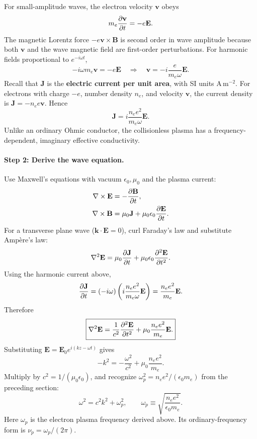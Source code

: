\documentclass[11pt]{article}
\newcommand{\epsz}{\epsilon_0}
\newcommand{\muz}{\mu_0}
\begin{document}
For small-amplitude waves, the electron velocity $\mathbf v$ obeys
\begin{equation}
m_e\pdv{\mathbf v}{t}=-e\mathbf E.
\end{equation}
The magnetic Lorentz force $-e\mathbf v\times\mathbf B$ is second order in wave amplitude because both $\mathbf v$ and the wave magnetic field are first-order perturbations. For harmonic fields proportional to $e^{-i\omega t}$,
\begin{equation}
-i\omega m_e\mathbf v=-e\mathbf E
\quad\Longrightarrow\quad
\boxed{\mathbf v=-i\frac{e}{m_e\omega}\mathbf E.}
\end{equation}
Recall that $\mathbf J$ is the \textbf{electric current per unit area}, with SI units $\mathrm{A\,m^{-2}}$. For electrons with charge $-e$, number density $n_e$, and velocity $\mathbf v$, the current density is $\boxed{\mathbf J=-n_e e\mathbf v}$. Hence
\begin{equation}
\boxed{\mathbf J=i\frac{n_e e^2}{m_e\omega}\mathbf E.}
\end{equation}
Unlike an ordinary Ohmic conductor, the collisionless plasma has a frequency-dependent, imaginary effective conductivity.

\paragraph{Step 2: Derive the wave equation.}
Use Maxwell's equations with vacuum $\epsz,\muz$ and the plasma current:
\begin{align}
\nabla\times\mathbf E&=-\pdv{\mathbf B}{t},\\
\nabla\times\mathbf B&=\muz\mathbf J+\muz\epsz\pdv{\mathbf E}{t}.
\end{align}
For a transverse plane wave ($\mathbf k\cdot\mathbf E=0$), curl Faraday's law and substitute Amp\`ere's law:
\begin{equation}
\nabla^2\mathbf E=\muz\pdv{\mathbf J}{t}+\muz\epsz\pdv[2]{\mathbf E}{t}.
\end{equation}
Using the harmonic current above,
\begin{equation}
\pdv{\mathbf J}{t}=(-i\omega)\left(i\frac{n_e e^2}{m_e\omega}\mathbf E\right)
=\frac{n_e e^2}{m_e}\mathbf E.
\end{equation}
Therefore
\begin{equation}
\boxed{\nabla^2\mathbf E=\frac{1}{c^2}\pdv[2]{\mathbf E}{t}+\muz\frac{n_e e^2}{m_e}\mathbf E.}
\end{equation}
Substituting $\mathbf E=\mathbf E_0e^{i(kz-\omega t)}$ gives
\begin{equation}
-k^2=-\frac{\omega^2}{c^2}+\muz\frac{n_e e^2}{m_e}.
\end{equation}
Multiply by $c^2=1/(\muz\epsz)$, and recognize $\omega_p^2=n_e e^2/(\epsz m_e)$ from the preceding section:
\begin{equation}
\boxed{\omega^2=c^2k^2+\omega_p^2},\qquad
\boxed{\omega_p\equiv\sqrt{\frac{n_e e^2}{\epsz m_e}}}.
\end{equation}
Here $\omega_p$ is the electron plasma frequency derived above. Its ordinary-frequency form is $\nu_p=\omega_p/(2\pi)$.
\end{document}
